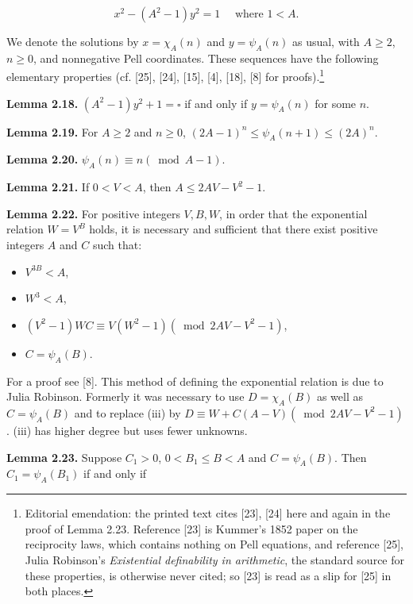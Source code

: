\documentclass[11pt,a4paper]{article}
\newcommand{\origpage}[1]{\marginnote{\footnotesize\textbf{[#1]}}}
\begin{document}
\[
x^{2}-\left(A^{2}-1\right) y^{2}=1 \quad \text { where } 1<A .
\]

We denote the solutions by $x=\chi_{A}(n)$ and $y=\psi_{A}(n)$ as usual, with $A\geq2$, $n\geq0$, and nonnegative Pell coordinates. These sequences have the following elementary properties (cf. [25], [24], [15], [4], [18], [8] for proofs).\footnote{Editorial emendation: the printed text cites [23], [24] here and again in the proof of Lemma 2.23. Reference [23] is Kummer's 1852 paper on the reciprocity laws, which contains nothing on Pell equations, and reference [25], Julia Robinson's \emph{Existential definability in arithmetic}, the standard source for these properties, is otherwise never cited; so [23] is read as a slip for [25] in both places.}

\noindent\textbf{Lemma 2.18.} $\left(A^{2}-1\right) y^{2}+1=\square$ if and only if $y=\psi_{A}(n)$ for some $n$.

\noindent\textbf{Lemma 2.19.} For $A\geq2$ and $n\geq0$, $(2 A-1)^{n} \leq \psi_{A}(n+1) \leq(2 A)^{n}$.

\noindent\textbf{Lemma 2.20.} $\psi_{A}(n) \equiv n(\bmod A-1)$.

\noindent\textbf{Lemma 2.21.} If $0<V<A$, then $A \leq 2 A V-V^{2}-1$.

\noindent\textbf{Lemma 2.22.}\origpage{556} For positive integers $V,\allowbreak B,\allowbreak W$, in order that the exponential relation $W=V^{B}$ holds, it is necessary and sufficient that there exist positive integers $A$ and $C$ such that:

\begin{itemize}
  \item[(i)] $V^{3 B}<A$,
  \item[(ii)] $W^{3}<A$,
  \item[(iii)] $\left(V^{2}-1\right) W C \equiv V\left(W^{2}-1\right)\left(\bmod 2 A V-V^{2}-1\right)$,
  \item[(iv)] $C=\psi_{A}(B)$.
\end{itemize}

For a proof see [8]. This method of defining the exponential relation is due to Julia Robinson. Formerly it was necessary to use $D=\chi_{A}(B)$ as well as $C=\psi_{A}(B)$ and to replace (iii) by $D \equiv W+C(A-V)\left(\bmod 2 A V-V^{2}-1\right)$. (iii) has higher degree but uses fewer unknowns.

\noindent\textbf{Lemma 2.23.} Suppose $C_1>0$, $0<B_{1} \leq B<A$ and $C=\psi_{A}(B)$. Then $C_{1}=\psi_{A}\left(B_{1}\right)$ if and only if
\end{document}
